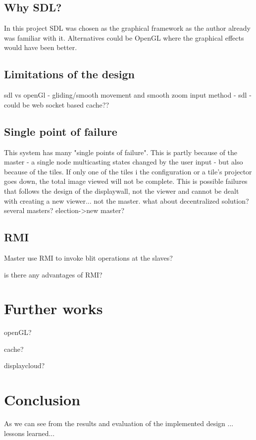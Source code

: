 \documentclass[12pt, a4paper, oneside]{article}
\begin{document}
\subsection{Why SDL?}
In this project SDL was chosen as the graphical framework as the author already was familiar with it. Alternatives could be OpenGL where the graphical effects would have been better. 

\subsection{Limitations of the design}
sdl vs openGl - gliding/smooth movement and smooth zoom
input method - sdl - could be web socket based
cache??

\subsection{Single point of failure}
This system has many "single points of failure". This is partly because of the master - a single node multicasting states changed by the user input - but also because of the tiles. If only one of the tiles i the configuration or a tile's projector goes down, the total image viewed will not be complete. This is possible failures that follows the design of the displaywall, not the viewer and cannot be dealt with creating a new viewer...
not the master. what about decentralized solution? several masters? election->new master?

\subsection{RMI}
Master use RMI to invoke blit operations at the slaves?

is there any advantages of RMI?

\newpage
\section{Further works}
openGL?

cache?

displaycloud?

\newpage
\section{Conclusion}
As we can see from the results and evaluation of the implemented design ...
lessons learned...

\newpage




\end{document}
